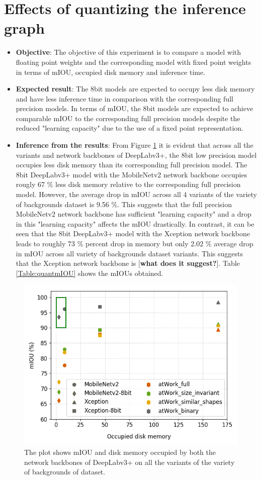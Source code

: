 \section{Effects of quantizing the inference graph}
	
	\begin{itemize}
		\item \textbf{Objective}: The objective of this experiment is to compare a model with floating point weights and the corresponding model with fixed point weights in terms of mIOU, occupied disk memory and inference time.
		\item \textbf{Expected result}: The 8bit models are expected to occupy less disk memory and have less inference time in comparison with the corresponding full precision models. In terms of mIOU, the 8bit models are expected to achieve comparable mIOU to the corresponding full precision models despite the reduced "learning capacity" due to the use of a fixed point representation. 
		\item \textbf{Inference from the results}: From Figure \ref{Fig:quant} it is evident that across all the variants and network backbones of DeepLabv3+, the 8bit low precision model occupies less disk memory than its corresponding full precision model. The 8bit DeepLabv3+ model with the MobileNetv2 network backbone occupies rougly 67 \% less disk memory relative to the corresponding full precision model. However, the average drop in mIOU across all 4 variants of the variety of backgrounds dataset is 9.56 \%. This suggests that the full precision MobileNetv2 network backbone has sufficient "learning capacity" and a drop in this "learning capacity" affects the mIOU drastically. In contrast, it can be seen that the 8bit DeepLabv3+ model with the Xception network backbone leads to roughly 73 \% percent drop in memory but only 2.02 \% average drop in mIOU across all variety of backgrounds dataset variants. This suggests that the Xception network backbone is [\textbf{what does it suggest?}]. Table \ref{Table:quantmIOU} shows the mIOUs obtained.
		
	\end{itemize}
	
	\begin{figure}
		\centering
		\includegraphics[width=.5\linewidth]{images/quant}
		\caption{The plot shows mIOU and disk memory occupied by both the network backbones of DeepLabv3+ on all the variants of the variety of backgrounds of dataset.}
		\label{Fig:quant}
	\end{figure}
	
